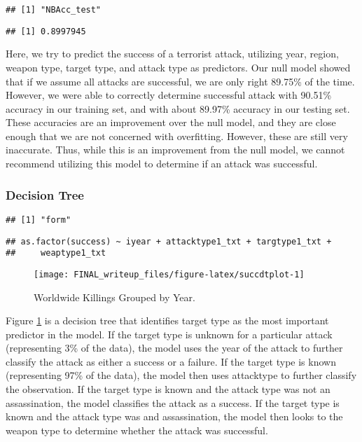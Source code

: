 \documentclass[11pt,letterpaper,]{article}
\theoremstyle{definition}
\theoremstyle{definition}
\theoremstyle{definition}
\theoremstyle{remark}
\begin{document}
\begin{verbatim}
## [1] "NBAcc_test"
\end{verbatim}

\begin{verbatim}
## [1] 0.8997945
\end{verbatim}

Here, we try to predict the success of a terrorist attack, utilizing
year, region, weapon type, target type, and attack type as predictors.
Our null model showed that if we assume all attacks are successful, we
are only right 89.75\% of the time. However, we were able to correctly
determine successful attack with 90.51\% accuracy in our training set,
and with about 89.97\% accuracy in our testing set. These accuracies are
an improvement over the null model, and they are close enough that we
are not concerned with overfitting. However, these are still very
inaccurate. Thus, while this is an improvement from the null model, we
cannot recommend utilizing this model to determine if an attack was
successful.

\subsubsection{Decision Tree}\label{decision-tree-1}

\begin{verbatim}
## [1] "form"
\end{verbatim}

\begin{verbatim}
## as.factor(success) ~ iyear + attacktype1_txt + targtype1_txt + 
##     weaptype1_txt
\end{verbatim}



\begin{figure}

{\centering \texttt{[image: FINAL\_writeup\_files/figure-latex/succdtplot-1]} 

}

\caption{Worldwide Killings Grouped by Year.}\label{fig:succdtplot}
\end{figure}

Figure \ref{fig:succdtplot} is a decision tree that identifies target
type as the most important predictor in the model. If the target type is
unknown for a particular attack (representing 3\% of the data), the
model uses the year of the attack to further classify the attack as
either a success or a failure. If the target type is known (representing
97\% of the data), the model then uses attacktype to further classify
the observation. If the target type is known and the attack type was not
an assassination, the model classifies the attack as a success. If the
target type is known and the attack type was and assassination, the
model then looks to the weapon type to determine whether the attack was
successful.
\end{document}
